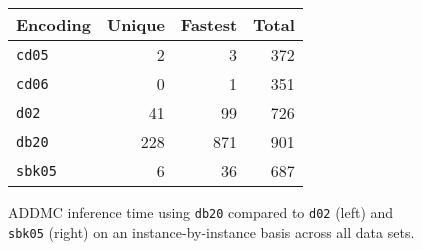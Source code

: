 \documentclass{article}
\theoremstyle{definition}
\theoremstyle{remark}
\begin{document}
\begin{figure}
  \centering
  \begin{minipage}{0.59\textwidth}
    \centering
  \end{minipage}
  \begin{minipage}{0.39\textwidth}
    \centering
    \begin{tabular}{lrrr}
      \toprule
      Encoding & Unique & Fastest & Total \\
      \midrule
      \texttt{cd05} & 2 & 3 & 372 \\
      \texttt{cd06} & 0 & 1 & 351 \\
      \texttt{d02} & 41 & 99 & 726 \\
      \texttt{db20} & 228 & 871 & 901 \\
      \texttt{sbk05} & 6 & 36 & 687 \\
      \bottomrule
    \end{tabular}
  \end{minipage}
\end{figure}

\begin{figure}
  \centering
  \caption{ADDMC inference time using \texttt{db20} compared to \texttt{d02}
    (left) and \texttt{sbk05} (right) on an instance-by-instance basis across
    all data sets.}
\end{figure}
\end{document}
